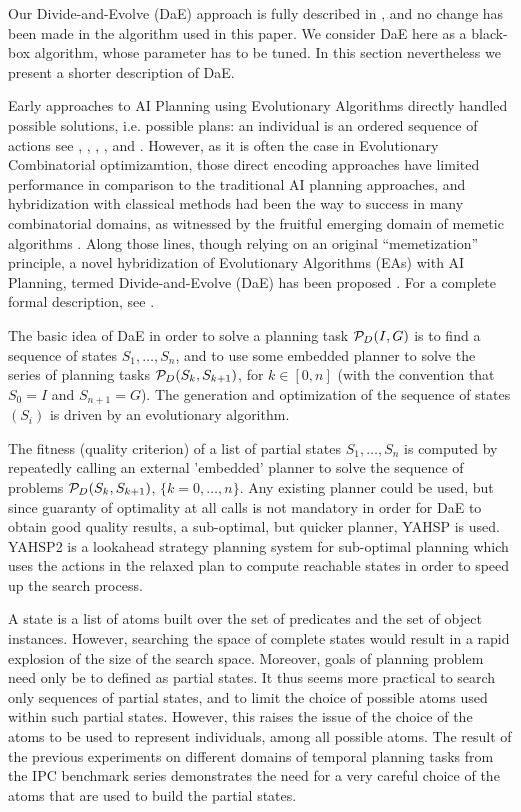 \documentclass{acm_proc_article-sp}
\begin{document}
Our Divide-and-Evolve (DaE) approach is fully described in \cite{BibEvoCop:2010}, and no change has been made in the algorithm used in this paper. We consider DaE here as a black-box algorithm, whose parameter has to be tuned. In this section nevertheless we present a shorter description of DaE.

Early approaches to AI Planning using Evolutionary Algorithms directly handled possible solutions, i.e. possible plans: an individual is an ordered sequence of actions see \cite{Spector-AAAI-94}, \cite{muslea97}, \cite{westerberg:2000}, \cite{westerberg:2001}, and \cite{Morignot-2005}. However, as it is often the case in Evolutionary Combinatorial optimizamtion, those direct encoding approaches have limited performance in comparison to the traditional AI planning approaches, and hybridization with classical methods had been the way to success in many combinatorial domains, as witnessed by the fruitful emerging domain of memetic algorithms \cite{MemeticBook:2005}. Along those lines, though relying on an original ``memetization'' principle, a novel hybridization of Evolutionary Algorithms (EAs) with AI Planning, termed Divide-and-Evolve (DaE) has been proposed \cite{DAE:EvoCOP06} \cite{DAE:book-2007}. For a complete formal description, see \cite{Bibai:ICAPS2010}.

The basic idea of DaE in order to solve a planning task ${\cal P}_D(I,G)$ is to find a sequence of states $S_1, \ldots, S_n$, and to use some embedded planner to solve the series of planning tasks ${\cal P}_D(S_{k},S_{k+1})$, for $k \in [0,n]$ (with the convention that $S_0 = I$ and $S_{n+1} = G$). The generation and optimization of the sequence of states $(S_i)$ is driven by an evolutionary algorithm. 

The fitness (quality criterion) of a list of partial states $S_1, \ldots, S_n$ is computed by repeatedly calling an external 'embedded' planner to solve the sequence of problems ${\cal P}_D(S_{k},S_{k+1})$, $\{k=0,\ldots,n\}$. Any existing planner could be used, but since guaranty of optimality at all calls is not mandatory in order for DaE to obtain good quality results, a sub-optimal, but quicker planner, YAHSP is used. YAHSP2 \cite{V:icaps04} is a lookahead strategy planning system for sub-optimal planning which uses the  actions in the relaxed plan to compute reachable states in order to speed up the search process. 

A state is a list of atoms built over the set of predicates and the set of object instances. However, searching the space of complete states would result in a rapid explosion of the size of the search space. Moreover, goals of planning problem need only be to defined as partial states. It thus seems more practical to search only sequences of partial states, and to limit the choice of possible atoms used within such partial states. However, this raises the issue of the choice of the atoms to be used to represent individuals, among all possible atoms. The result of the previous experiments on different domains of temporal planning tasks from the IPC benchmark series \cite{BibEvoCop2009} demonstrates the need for a very careful choice of the atoms that are used to build the partial states. 
\end{document}
